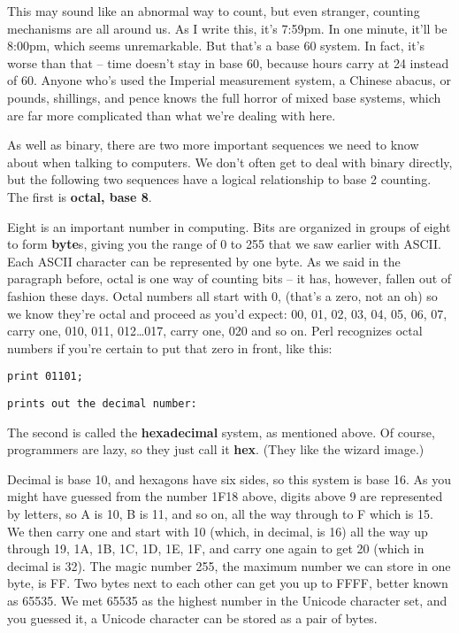 \documentclass[a4paper,11pt]{book}
\begin{document}
\noindent 

\noindent This may sound like an abnormal way to count, but even stranger, counting mechanisms are all around us. As I write this, it's 7:59pm. In one minute, it'll be 8:00pm, which seems unremarkable. But that's a base 60 system. In fact, it's worse than that -- time doesn't stay in base 60, because hours carry at 24 instead of 60. Anyone who's used the Imperial measurement system, a Chinese abacus, or pounds, shillings, and pence knows the full horror of mixed base systems, which are far more complicated than what we're dealing with here.

\noindent 

\noindent As well as binary, there are two more important sequences we need to know about when talking to computers. We don't often get to deal with binary directly, but the following two sequences have a logical relationship to base 2 counting. The first is \textbf{octal, base 8}.

\noindent 

\noindent Eight is an important number in computing. Bits are organized in groups of eight to form \textbf{byte}s, giving you the range of 0 to 255 that we saw earlier with ASCII. Each ASCII character can be represented by one byte. As we said in the paragraph before, octal is one way of counting bits -- it has, however, fallen out of fashion these days. Octal numbers all start with 0, (that's a zero, not an oh) so we know they're octal and proceed as you'd expect: 00, 01, 02, 03, 04, 05, 06, 07, carry one, 010, 011, 012\dots 017, carry one, 020 and so on. Perl recognizes octal numbers if you're certain to put that zero in front, like this:

\noindent 

\noindent \texttt{print 01101;}

\noindent 

\noindent \texttt{prints out the decimal number:}

\noindent 


\noindent The second is called the \textbf{hexadecimal }system, as mentioned above. Of course, programmers are lazy, so they just call it \textbf{hex}. (They like the wizard image.)

\noindent 

\noindent 

\noindent Decimal is base 10, and hexagons have six sides, so this system is base 16. As you might have guessed from the number 1F18 above, digits above 9 are represented by letters, so A is 10, B is 11, and so on, all the way through to F which is 15. We then carry one and start with 10 (which, in decimal, is 16) all the way up through 19, 1A, 1B, 1C, 1D, 1E, 1F, and carry one again to get 20 (which in decimal is 32). The magic number 255, the maximum number we can store in one byte, is FF. Two bytes next to each other can get you up to FFFF, better known as 65535. We met 65535 as the highest number in the Unicode character set, and you guessed it, a Unicode character can be stored as a pair of bytes.
\end{document}
